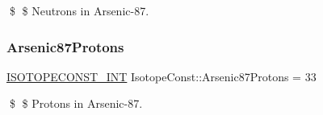 \$ \$ Neutrons in Arsenic-\/87. \mbox{\label{group___isotope_const-_arsenic-_as87_ga6095a6a072cbe286516dd7648e61dfca}} 
\subsubsection{\texorpdfstring{Arsenic87\+Protons}{Arsenic87Protons}}
{\footnotesize\ttfamily \mbox{\hyperlink{group___isotope_const-_macros_ga5f18360b3e99483a35c32d789e62621c}{I\+S\+O\+T\+O\+P\+E\+C\+O\+N\+S\+T\+\_\+\+I\+NT}} Isotope\+Const\+::\+Arsenic87\+Protons = 33}

\$ \$ Protons in Arsenic-\/87. 
